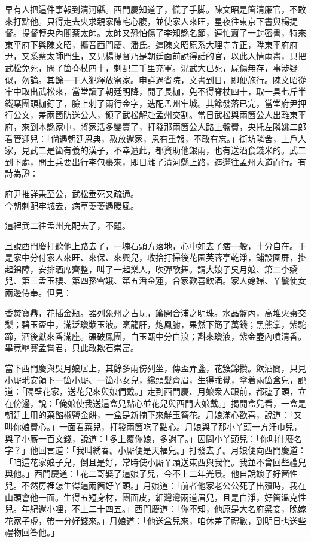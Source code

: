 早有人把這件事報到清河縣。西門慶知道了，慌了手脚。陳文昭是箇清廉官，不敢來打點他。只得走去央求親家陳宅心腹，並使家人來旺，{}星夜往東京下書與楊提督。提督轉央內閣蔡太師。太師又恐怕傷了李知縣名節，{}連忙齎了一封密書，特來東平府下與陳文昭，擴音西門慶、潘氏。這陳文昭原系大理寺寺正，陞東平府府尹，又系蔡太師門生，又見楊提督乃是朝廷面前說得話的官，以此人情兩盡，只把武松免死，問了箇脊杖四十，刺配二千里充軍。況武大已死，屍傷無存，事涉疑似，勿論。其餘一干人犯釋放甯家。申詳過省院，文書到日，即便施行。陳文昭從牢中取出武松來，當堂讀了朝廷明降，開了長枷，免不得脊杖四十，取一具七斤半鐵葉團頭枷釘了，臉上刺了兩行金字，迭配孟州牢城。其餘發落已完，當堂府尹押行公文，差兩箇防送公人，領了武松解赴孟州交割。當日武松與兩箇公人出離東平府，來到本縣家中，將家活多變賣了，打發那兩箇公人路上盤費，央托左隣姚二郎看管迎兒：「倘遇朝廷恩典，赦放還家，恩有重報，不敢有忘。」街坊隣舍，上戶人家，見武二是箇有義的漢子，不幸遭此，都資助他銀兩，也有送酒食錢米的。武二到下處，問土兵要出行李包裹來，即日離了清河縣上路，迤邐往孟州大道而行。有詩為證：

\begin{myquote}
府尹推詳秉至公，武松垂死又疏通。\\今朝刺配牢城去，病草萋萋遇暖風。
\end{myquote}

這裡武二往孟州充配去了，不題。

且說西門慶打聽他上路去了，一塊石頭方落地，心中如去了痞一般，十分自在。于是家中分付家人來旺、來保、來興兒，收拾打掃後花園芙蓉亭乾淨，鋪設圍屏，掛起錦障，安排酒席齊整，叫了一起樂人，吹彈歌舞。請大娘子吳月娘、第二李嬌兒、第三孟玉樓、第四孫雪娥、第五潘金蓮，合家歡喜飲酒。家人媳婦、丫鬟使女兩邊侍奉。但見：

\begin{myquote}
香焚寶鼎，花插金瓶。器列象州之古玩，簾開合浦之明珠。水晶盤內，高堆火棗交梨；碧玉盃中，滿泛瓊漿玉液。烹龍肝，炮鳳腑，果然下筯了萬錢；黑熊掌，紫駝蹄，酒後獻來香滿座。碾破鳳團，白玉甌中分白浪；斟來瓊液，紫金壺內噴清香。畢竟壓賽孟嘗君，只此敢欺石崇富。
\end{myquote}

當下西門慶與吳月娘居上，其餘多兩傍列坐，傳盃弄盞，花簇錦攢。飲酒間，只見小厮玳安領下一箇小厮、一箇小女兒，纔頭髮齊眉，生得乖覺，拿着兩箇盒兒，說道：「隔壁花家，送花兒來與娘們戴。」走到西門慶、月娘衆人跟前，都磕了頭，立在傍邊，說：「俺娘使我送這盒兒點心並花兒與西門大娘戴。」揭開盒兒看，一盒是朝廷上用的菓餡椒鹽金餅，一盒是新摘下來鮮玉簪花。月娘滿心歡喜，說道：「又叫你娘費心。」一面看菜兒，打發兩箇吃了點心。月娘與了那小丫頭一方汗巾兒，與了小厮一百文錢，說道：「多上覆你娘，多謝了。」因問小丫頭兒：「你叫什麼名字？」他回言道：「我叫綉春。小厮便是天福兒。」打發去了。月娘便向西門慶道：「咱這花家娘子兒，倒且是好，常時使小厮丫頭送東西與我們。我並不曾回些禮兒與他。」西門慶道：「花二哥娶了這娘子兒，今不上二年光景。他自說娘子好箇性兒。不然房裡怎生得這兩箇好丫頭。」{}{}月娘道：「前者他家老公公死了出殯時，我在山頭會他一面。生得五短身材，團面皮，細灣灣兩道眉兒，且是白淨，好箇溫克性兒。年紀還小哩，不上二十四五。」西門慶道：「你不知，他原是大名府梁妾，晚嫁花家子虛，帶一分好錢來。」月娘道：「他送盒兒來，咱休差了禮數，到明日也送些禮物回答他。」

